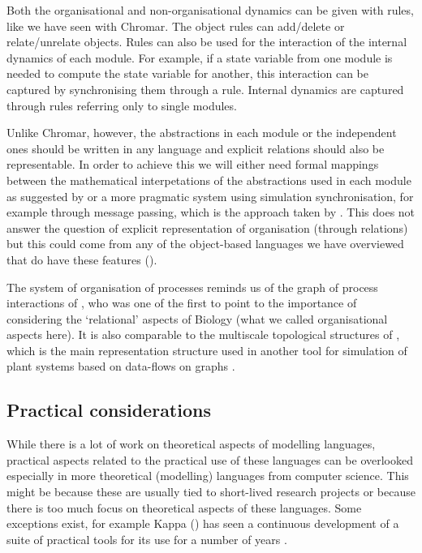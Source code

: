 Both the organisational and non-organisational dynamics can be given with rules,
like we have seen with Chromar. The object rules can add/delete or
relate/unrelate objects. Rules can also be used for the interaction of the
internal dynamics of each module. For example, if a state variable from one
module is needed to compute the state variable for another, this interaction can
be captured by synchronising them through a rule. Internal dynamics are captured
through rules referring only to single modules.

Unlike Chromar, however, the abstractions in each module or the independent ones
should be written in any language and explicit relations should also be
representable. In order to achieve this we will either need formal mappings
between the mathematical interpetations of the abstractions used in each module
as suggested by \citet{mjolsness_prospects_2018} or a more pragmatic system
using simulation synchronisation, for example through message passing, which is
the approach taken by \citet{cis_2018}. This does not answer the question of
explicit representation of organisation (through relations) but this could come
from any of the object-based languages we have overviewed that do have these
features ().

The system of organisation of processes reminds us of the graph of process
interactions of \citet{rashevsky_topology_1954}, who was one of the first to
point to the importance of considering the `relational' aspects of Biology (what
we called organisational aspects here). It is also comparable to the multiscale
topological structures of \citet{godin_multiscale_1998}, which is the main
representation structure used in another tool for simulation of plant systems
based on data-flows on graphs \citep[OpenAlea;][]{pradal_openalea:_2008}.


\subsection{Practical considerations}
While there is a lot of work on theoretical aspects of modelling languages,
practical aspects related to the practical use of these languages can be
overlooked especially in more theoretical (modelling) languages from computer
science. This might be because these are usually tied to short-lived research
projects or because there is too much focus on theoretical aspects of these
languages. Some exceptions exist, for example Kappa () has seen a
continuous development of a suite of practical tools for its use for a number of
years \citep[Kappa platform;][]{boutillier2018kappa}.


